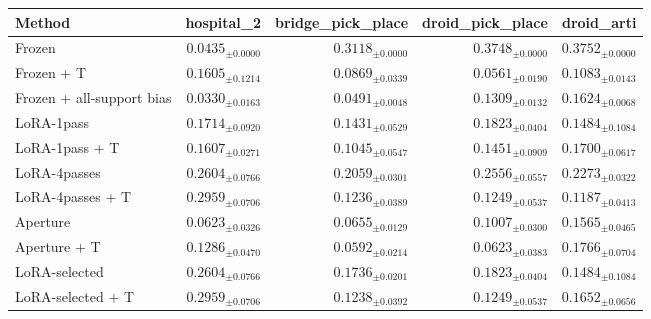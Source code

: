 \begin{tabular}{lrrrr}
\toprule
Method & hospital\_2 & bridge\_pick\_place & droid\_pick\_place & droid\_arti \\
\midrule
Frozen & $0.0435_{\pm 0.0000}$ & $0.3118_{\pm 0.0000}$ & $0.3748_{\pm 0.0000}$ & $0.3752_{\pm 0.0000}$ \\
Frozen + T & $0.1605_{\pm 0.1214}$ & $0.0869_{\pm 0.0339}$ & $0.0561_{\pm 0.0190}$ & $0.1083_{\pm 0.0143}$ \\
Frozen + all-support bias & $0.0330_{\pm 0.0163}$ & $0.0491_{\pm 0.0048}$ & $0.1309_{\pm 0.0132}$ & $0.1624_{\pm 0.0068}$ \\
LoRA-1pass & $0.1714_{\pm 0.0920}$ & $0.1431_{\pm 0.0529}$ & $0.1823_{\pm 0.0404}$ & $0.1484_{\pm 0.1084}$ \\
LoRA-1pass + T & $0.1607_{\pm 0.0271}$ & $0.1045_{\pm 0.0547}$ & $0.1451_{\pm 0.0909}$ & $0.1700_{\pm 0.0617}$ \\
LoRA-4passes & $0.2604_{\pm 0.0766}$ & $0.2059_{\pm 0.0301}$ & $0.2556_{\pm 0.0557}$ & $0.2273_{\pm 0.0322}$ \\
LoRA-4passes + T & $0.2959_{\pm 0.0706}$ & $0.1236_{\pm 0.0389}$ & $0.1249_{\pm 0.0537}$ & $0.1187_{\pm 0.0413}$ \\
Aperture & $0.0623_{\pm 0.0326}$ & $0.0655_{\pm 0.0129}$ & $0.1007_{\pm 0.0300}$ & $0.1565_{\pm 0.0465}$ \\
Aperture + T & $0.1286_{\pm 0.0470}$ & $0.0592_{\pm 0.0214}$ & $0.0623_{\pm 0.0383}$ & $0.1766_{\pm 0.0704}$ \\
LoRA-selected & $0.2604_{\pm 0.0766}$ & $0.1736_{\pm 0.0201}$ & $0.1823_{\pm 0.0404}$ & $0.1484_{\pm 0.1084}$ \\
LoRA-selected + T & $0.2959_{\pm 0.0706}$ & $0.1238_{\pm 0.0392}$ & $0.1249_{\pm 0.0537}$ & $0.1652_{\pm 0.0656}$ \\
\bottomrule
\end{tabular}
